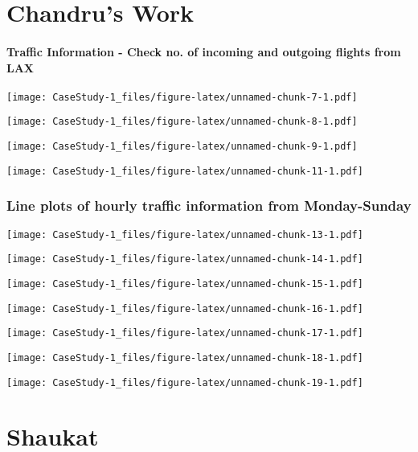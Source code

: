 \documentclass[]{article}
\let\oldparagraph\paragraph
\renewcommand{\paragraph}[1]{\oldparagraph{#1}\mbox{}}
\begin{document}
\hypertarget{chandrus-work}{%
\section{Chandru's Work}\label{chandrus-work}}

\hypertarget{traffic-information---check-no.-of-incoming-and-outgoing-flights-from-lax}{%
\paragraph{Traffic Information - Check no. of incoming and outgoing
flights from
LAX}\label{traffic-information---check-no.-of-incoming-and-outgoing-flights-from-lax}}

\texttt{[image: CaseStudy-1\_files/figure-latex/unnamed-chunk-7-1.pdf]}

\texttt{[image: CaseStudy-1\_files/figure-latex/unnamed-chunk-8-1.pdf]}

\texttt{[image: CaseStudy-1\_files/figure-latex/unnamed-chunk-9-1.pdf]}

\texttt{[image: CaseStudy-1\_files/figure-latex/unnamed-chunk-11-1.pdf]}

\hypertarget{line-plots-of-hourly-traffic-information-from-monday-sunday}{%
\subsubsection{Line plots of hourly traffic information from
Monday-Sunday}\label{line-plots-of-hourly-traffic-information-from-monday-sunday}}

\texttt{[image: CaseStudy-1\_files/figure-latex/unnamed-chunk-13-1.pdf]}

\texttt{[image: CaseStudy-1\_files/figure-latex/unnamed-chunk-14-1.pdf]}

\texttt{[image: CaseStudy-1\_files/figure-latex/unnamed-chunk-15-1.pdf]}

\texttt{[image: CaseStudy-1\_files/figure-latex/unnamed-chunk-16-1.pdf]}

\texttt{[image: CaseStudy-1\_files/figure-latex/unnamed-chunk-17-1.pdf]}

\texttt{[image: CaseStudy-1\_files/figure-latex/unnamed-chunk-18-1.pdf]}

\texttt{[image: CaseStudy-1\_files/figure-latex/unnamed-chunk-19-1.pdf]}

\hypertarget{shaukat}{%
\section{Shaukat}\label{shaukat}}
\end{document}
